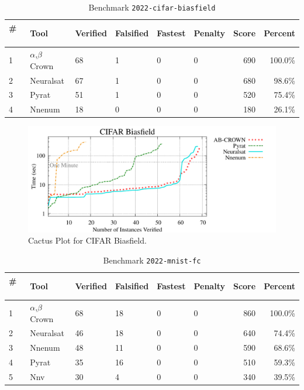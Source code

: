 
\begin{table}[h]
\begin{center}
\caption{Benchmark \texttt{2022-cifar-biasfield}} \label{tab:cat_{cat}}
{\setlength{\tabcolsep}{2pt}
\begin{tabular}[h]{@{}llllllrr@{}}
\toprule
\textbf{\# ~} & \textbf{Tool} & \textbf{Verified} & \textbf{Falsified} & \textbf{Fastest} & \textbf{Penalty} & \textbf{Score} & \textbf{Percent}\\
\midrule
1 & $\alpha$,$\beta$ Crown & 68 & 1 & 0 & 0 & 690 & 100.0\% \\
2 & Neuralsat & 67 & 1 & 0 & 0 & 680 & 98.6\% \\
3 & Pyrat & 51 & 1 & 0 & 0 & 520 & 75.4\% \\
4 & Nnenum & 18 & 0 & 0 & 0 & 180 & 26.1\% \\
\bottomrule
\end{tabular}
}
\end{center}
\end{table}



\begin{figure}[h]
\centerline{\includegraphics[width=\textwidth]{cactus/2022_cifar_biasfield.pdf}}
\caption{Cactus Plot for CIFAR Biasfield.}
\label{fig:quantPic}
\end{figure}



\begin{table}[h]
\begin{center}
\caption{Benchmark \texttt{2022-mnist-fc}} \label{tab:cat_{cat}}
{\setlength{\tabcolsep}{2pt}
\begin{tabular}[h]{@{}llllllrr@{}}
\toprule
\textbf{\# ~} & \textbf{Tool} & \textbf{Verified} & \textbf{Falsified} & \textbf{Fastest} & \textbf{Penalty} & \textbf{Score} & \textbf{Percent}\\
\midrule
1 & $\alpha$,$\beta$ Crown & 68 & 18 & 0 & 0 & 860 & 100.0\% \\
2 & Neuralsat & 46 & 18 & 0 & 0 & 640 & 74.4\% \\
3 & Nnenum & 48 & 11 & 0 & 0 & 590 & 68.6\% \\
4 & Pyrat & 35 & 16 & 0 & 0 & 510 & 59.3\% \\
5 & Nnv & 30 & 4 & 0 & 0 & 340 & 39.5\% \\
\bottomrule
\end{tabular}
}
\end{center}
\end{table}



